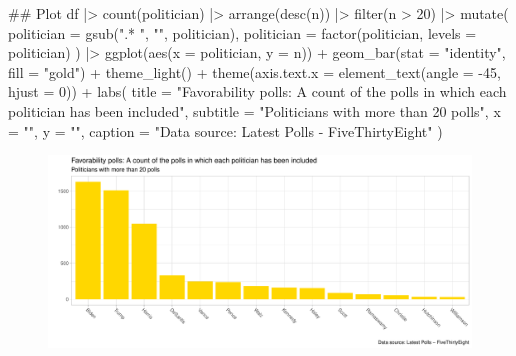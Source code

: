 \documentclass[
  12pt,
  letterpaper,
  DIV=11,
  numbers=noendperiod]{scrartcl}
\newenvironment{Shaded}{}{}
\newcommand{\AttributeTok}[1]{\textcolor[rgb]{0.65,0.15,0.64}{#1}}
\newcommand{\DecValTok}[1]{\textcolor[rgb]{0.60,0.41,0.00}{#1}}
\newcommand{\DocumentationTok}[1]{\textcolor[rgb]{0.89,0.34,0.29}{#1}}
\newcommand{\FunctionTok}[1]{\textcolor[rgb]{0.25,0.47,0.95}{#1}}
\newcommand{\NormalTok}[1]{\textcolor[rgb]{0.22,0.23,0.26}{#1}}
\newcommand{\SpecialCharTok}[1]{\textcolor[rgb]{0.00,0.52,0.74}{#1}}
\newcommand{\StringTok}[1]{\textcolor[rgb]{0.31,0.63,0.31}{#1}}
\begin{document}
\begin{Shaded}
\begin{Highlighting}[]
\DocumentationTok{\#\# Plot}
\NormalTok{df }\SpecialCharTok{|\textgreater{}}
  \FunctionTok{count}\NormalTok{(politician) }\SpecialCharTok{|\textgreater{}}
  \FunctionTok{arrange}\NormalTok{(}\FunctionTok{desc}\NormalTok{(n)) }\SpecialCharTok{|\textgreater{}}
  \FunctionTok{filter}\NormalTok{(n }\SpecialCharTok{\textgreater{}} \DecValTok{20}\NormalTok{) }\SpecialCharTok{|\textgreater{}}
  \FunctionTok{mutate}\NormalTok{(}
    \AttributeTok{politician =} \FunctionTok{gsub}\NormalTok{(}\StringTok{".* "}\NormalTok{, }\StringTok{""}\NormalTok{, politician),}
    \AttributeTok{politician =} \FunctionTok{factor}\NormalTok{(politician, }\AttributeTok{levels =}\NormalTok{ politician)}
\NormalTok{  ) }\SpecialCharTok{|\textgreater{}}
  \FunctionTok{ggplot}\NormalTok{(}\FunctionTok{aes}\NormalTok{(}\AttributeTok{x =}\NormalTok{ politician, }\AttributeTok{y =}\NormalTok{ n))  }\SpecialCharTok{+}
  \FunctionTok{geom\_bar}\NormalTok{(}\AttributeTok{stat =} \StringTok{"identity"}\NormalTok{, }\AttributeTok{fill =} \StringTok{"gold"}\NormalTok{) }\SpecialCharTok{+}
  \FunctionTok{theme\_light}\NormalTok{() }\SpecialCharTok{+} 
  \FunctionTok{theme}\NormalTok{(}\AttributeTok{axis.text.x =} \FunctionTok{element\_text}\NormalTok{(}\AttributeTok{angle =} \SpecialCharTok{{-}}\DecValTok{45}\NormalTok{, }\AttributeTok{hjust =} \DecValTok{0}\NormalTok{)) }\SpecialCharTok{+}
  \FunctionTok{labs}\NormalTok{(}
    \AttributeTok{title =} \StringTok{"Favorability polls: A count of the polls in which each politician has been included"}\NormalTok{,}
    \AttributeTok{subtitle =} \StringTok{"Politicians with more than 20 polls"}\NormalTok{,}
    \AttributeTok{x =} \StringTok{""}\NormalTok{,}
    \AttributeTok{y =} \StringTok{""}\NormalTok{,}
    \AttributeTok{caption =} \StringTok{"Data source: Latest Polls {-} FiveThirtyEight"}
\NormalTok{  )}
\end{Highlighting}
\end{Shaded}

\begin{figure}[H]

{\centering \includegraphics{assignment_1_files/figure-pdf/unnamed-chunk-4-1.pdf}

}

\end{figure}
\end{document}
